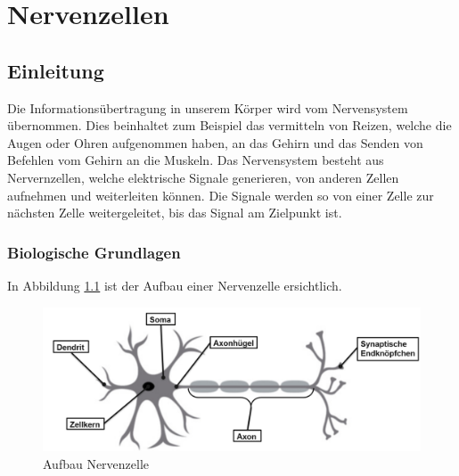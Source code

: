 %
%
%
%
\chapter{Nervenzellen\label{chapter:nerven}}
\begin{refsection}
\section{Einleitung}


Die Informationsübertragung in unserem Körper wird vom Nervensystem übernommen.
Dies beinhaltet zum Beispiel das vermitteln von Reizen, welche die Augen oder Ohren aufgenommen haben,
an das Gehirn und das Senden von Befehlen vom Gehirn an die Muskeln.
Das Nervensystem besteht aus Nervernzellen, welche elektrische Signale generieren, von anderen Zellen aufnehmen und weiterleiten können.
Die Signale werden so von einer Zelle zur nächsten Zelle weitergeleitet, bis das Signal am Zielpunkt ist.
\subsection{Biologische Grundlagen}
In Abbildung \ref{fig:Aufbau Nervenzelle} ist der Aufbau einer Nervenzelle ersichtlich. 
\begin{figure}[h]
    \centering
    \includegraphics[width=\textwidth]{papers/nerven/Bilder/NervenAufbau2.png}
    \caption{Aufbau Nervenzelle}
    \label{fig:Aufbau Nervenzelle}
\end{figure}



\end{refsection}
